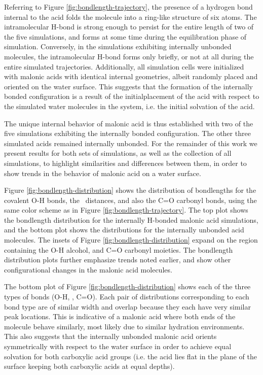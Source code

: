 Referring to Figure \ref{fig:bondlength-trajectory}, the presence of a hydrogen bond internal to the acid folds the molecule into a ring-like structure of six atoms. The intramolecular H-bond is strong enough to persist for the entire length of two of the five simulations, and forms at some time during the equilibration phase of simulation. Conversely, in the simulations exhibiting internally unbonded molecules, the intramolecular H-bond forms only briefly, or not at all during the entire simulated trajectories. Additionally, all simulation cells were initialized with malonic acids with identical internal geometries, albeit randomly placed and oriented on the water surface. This suggests that the formation of the internally bonded configuration is a result of the initialplacement of the acid with respect to the simulated water molecules in the system, i.e. the initial solvation of the acid.

The unique internal behavior of malonic acid is thus established with two of the five simulations exhibiting the internally bonded configuration. The other three simulated acids remained internally unbonded. For the remainder of this work we present results for both sets of simulations, as well as the collection of all simulations, to highlight similarities and differences between them, in order to show trends in the behavior of malonic acid on a water surface.

Figure \ref{fig:bondlength-distribution} shows the distribution of bondlengths for the covalent O-H bonds, the \ocarb~distances, and also the C=O carbonyl bonds, using the same color scheme as in Figure \ref{fig:bondlength-trajectory}. The top plot shows the bondlength distribution for the internally H-bonded malonic acid simulations, and the bottom plot shows the distributions for the internally unbonded acid molecules. The insets of Figure \ref{fig:bondlength-distribution} expand on the region containing the O-H alcohol, and C=O carbonyl moieties. The bondlength distribution plots further emphasize trends noted earlier, and show other configurational changes in the malonic acid molecules.

The bottom plot of Figure \ref{fig:bondlength-distribution} shows each of the three types of bonds (O-H, \ocarb, C=O). Each pair of distributions corresponding to each bond type are of similar width and overlap because they each have very similar peak locations. This is indicative of a malonic acid where both ends of the molecule behave similarly, most likely due to similar hydration environments. This also suggests that the internally unbonded malonic acid orients symmetrically with respect to the water surface in order to achieve equal solvation for both carboxylic acid groups (i.e. the acid lies flat in the plane of the surface keeping both carboxylic acids at equal depths). 

